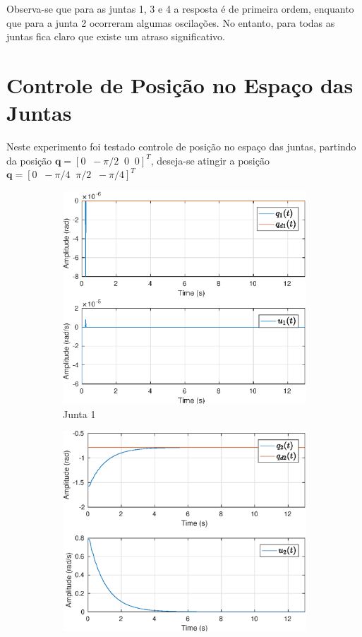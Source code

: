 Observa-se que para as juntas 1, 3 e 4 a resposta é de primeira ordem, enquanto que para a junta 2 ocorreram algumas oscilações. No entanto, para todas as juntas fica claro que existe um atraso significativo. 
	

\section{Controle de Posição no Espaço das Juntas}

Neste experimento foi testado controle de posição no espaço das juntas, partindo da posição $\bm{q} =[ 0 \;\; -\pi/2 \;\; 0 \;\; 0]^T$, deseja-se atingir a posição $\bm{q} =[ 0 \;\; -\pi/4 \;\; \pi/2  \;\; -\pi/4]^T$
\begin{figure}[H]
\centering
\begin{subfigure}{.5\textwidth}
  \centering
  \includegraphics[width=\linewidth]{./img/joint_test1/q1.eps}
  \caption{Junta 1}
  \label{fig:sub1}
\end{subfigure}%
\begin{subfigure}{.5\textwidth}
  \centering
  \includegraphics[width=\linewidth]{./img/joint_test1/q2.eps}

\end{subfigure}
\end{figure}
